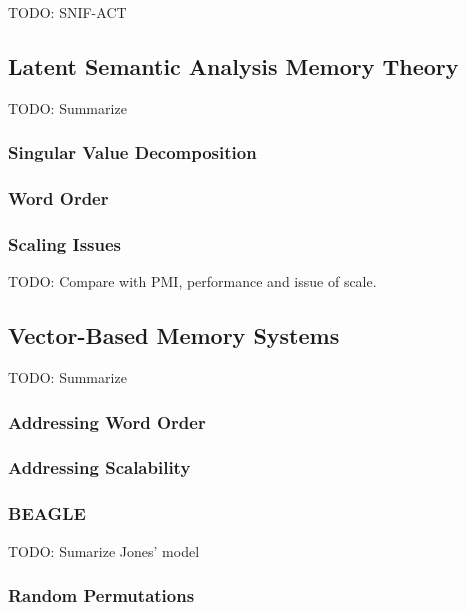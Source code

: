 \documentclass[man]{apa6}
\begin{document}
\cite{Douglass2010}

TODO: SNIF-ACT \cite{Fu2007} \cite{Pirolli2003}

\subsection{Latent Semantic Analysis Memory Theory}

TODO: Summarize \cite{Landauer1997}

\subsubsection{Singular Value Decomposition}

\subsubsection{Word Order}

\subsubsection{Scaling Issues}

TODO: Compare with PMI, performance and issue of scale. \cite{Budiu2007}

\subsection{Vector-Based Memory Systems}

TODO: Summarize \cite{Plate1995}

\subsubsection{Addressing Word Order}

\subsubsection{Addressing Scalability}

\subsubsection{BEAGLE}

TODO: Sumarize Jones' model \cite{Jones2007}

\subsubsection{Random Permutations}
\end{document}
